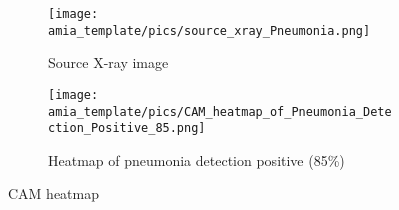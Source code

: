 \documentclass{amia}
\begin{document}
\makeatletter

\bigskip

\begin{figure}
\centering
\begin{subfigure}{.4\textwidth}
  \centering
  \texttt{[image: amia\_template/pics/source\_xray\_Pneumonia.png]}
  \caption{Source X-ray image}
  \label{fig:sub1}
\end{subfigure}
\begin{subfigure}{.4\textwidth}
  \centering
  \texttt{[image: amia\_template/pics/CAM\_heatmap\_of\_Pneumonia\_Detection\_Positive\_85.png]}
  \caption{Heatmap of pneumonia detection positive (85\%)}
  \label{fig:sub2}
\end{subfigure}
\caption{CAM heatmap \cite{ref5} }
\label{fig:cam_heatmap}
\end{figure}

\renewcommand{\@biblabel}[1]{\hfill #1.}
\makeatother
\end{document}
